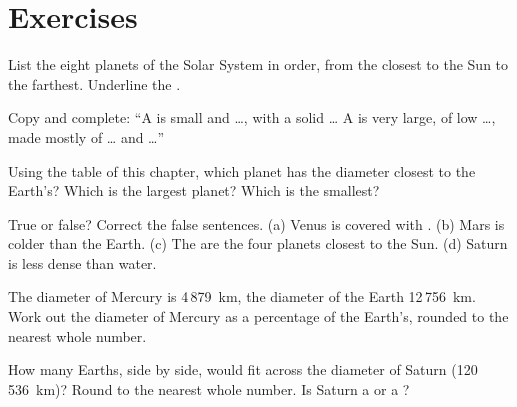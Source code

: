\section{Exercises}

\begin{exercise}[$\star$]\label{exo:g6:earth-a-planet:1}
List the eight planets of the Solar System in order, from the closest to
the Sun to the farthest. Underline the .
\end{exercise}

\begin{exercise}[$\star$]\label{exo:g6:earth-a-planet:2}
Copy and complete: ``A  is small and \ldots, with a solid
\ldots{} A  is very large, of low \ldots, made mostly of
\ldots{} and \ldots{}''
\end{exercise}

\begin{exercise}[$\star$]\label{exo:g6:earth-a-planet:3}
Using the table of this chapter, which planet has the diameter closest to
the Earth's? Which is the largest planet? Which is the smallest?
\end{exercise}

\begin{exercise}[$\star$]\label{exo:g6:earth-a-planet:4}
True or false? Correct the false sentences.
(a) Venus is covered with .
(b) Mars is colder than the Earth.
(c) The  are the four planets closest to the Sun.
(d) Saturn is less dense than water.
\end{exercise}

\begin{exercise}[$\star\star$]\label{exo:g6:earth-a-planet:5}
The diameter of Mercury is 4\,879~km, the diameter of the Earth
12\,756~km. Work out the diameter of Mercury as a percentage of the
Earth's, rounded to the nearest whole number.
\end{exercise}

\begin{exercise}[$\star\star$]\label{exo:g6:earth-a-planet:6}
How many Earths, side by side, would fit across the diameter of Saturn
(120\,536~km)? Round to the nearest whole number. Is Saturn a 
or a ?
\end{exercise}

